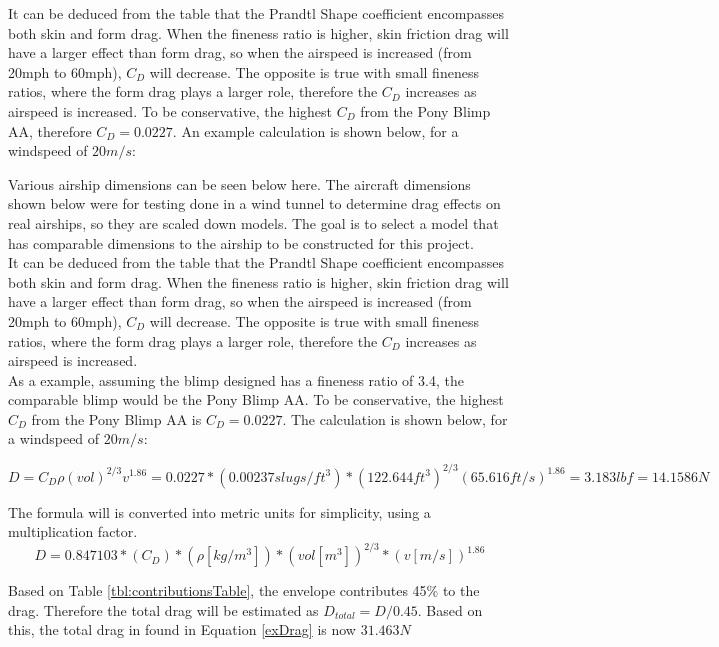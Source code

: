 \documentclass[../main.tex]{subfiles}
\begin{document}
It can be deduced from the table that the Prandtl Shape coefficient encompasses both skin and form drag. When the fineness ratio is higher, skin friction drag will have a larger effect than form drag, so when the airspeed is increased (from 20mph to 60mph), $C_D$ will decrease. The opposite is true with small fineness ratios, where the form drag plays a larger role, therefore the $C_D$ increases as airspeed is increased. To be conservative, the highest $C_D$ from the Pony Blimp AA, therefore $C_D = 0.0227$. An example calculation is shown below, for a windspeed of $20m/s$:

Various airship dimensions can be seen below here. The aircraft dimensions shown below were for testing done in a wind tunnel to determine drag effects on real airships, so they are scaled down models. The goal is to select a model that has comparable dimensions to the airship to be constructed for this project.\\

It can be deduced from the table that the Prandtl Shape coefficient encompasses both skin and form drag. When the fineness ratio is higher, skin friction drag will have a larger effect than form drag, so when the airspeed is increased (from 20mph to 60mph), $C_D$ will decrease. The opposite is true with small fineness ratios, where the form drag plays a larger role, therefore the $C_D$ increases as airspeed is increased. \\

As a example, assuming the blimp designed has a fineness ratio of 3.4, the comparable blimp would be the Pony Blimp AA. To be conservative, the highest $C_D$ from the Pony Blimp AA is $C_D = 0.0227$. The calculation is shown below, for a windspeed of $20m/s$:

\begin{equation} \label{exDrag}
D = C_D\rho (vol)^{2/3}v^{1.86}=0.0227*(0.00237 slugs/ft^3)*(122.644 ft^3)^{2/3}(65.616 ft/s) ^{1.86} = 3.183 lbf = 14.1586N 
\end{equation}

The formula will is converted into metric units for simplicity, using a multiplication factor.
\begin{equation}
D = 0.847103*(C_D)*(\rho[kg/m^3])*(vol [m^3])^{2/3}*(v [m/s])^{1.86}
\end{equation}

Based on Table \ref{tbl:contributionsTable}, the envelope contributes 45\% to the drag. Therefore the total drag will be estimated as $D_{total}=D/0.45$. Based on this, the total drag in found in Equation \ref{exDrag} is now $31.463N$
\end{document}
